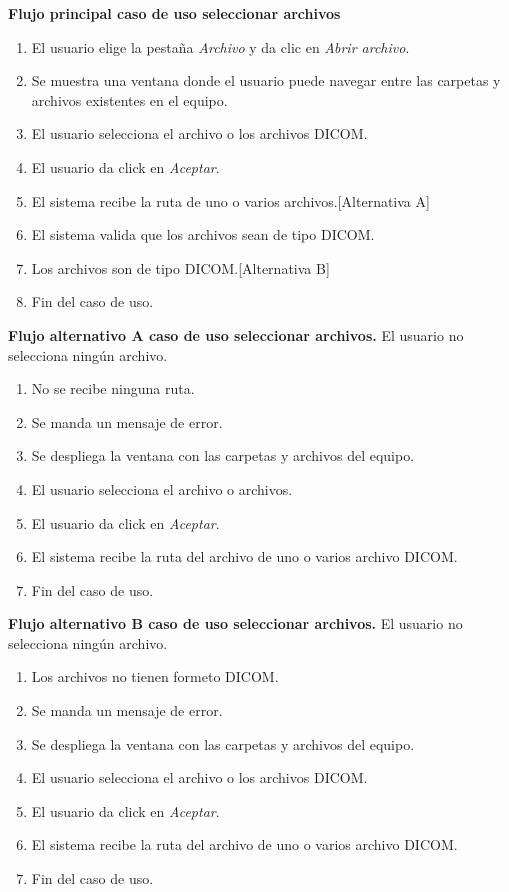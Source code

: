 \documentclass[12pt]{report}
\begin{document}
\textbf{Flujo principal caso de uso seleccionar archivos}
\begin{enumerate}
\item El usuario elige la pestaña \textit{Archivo} y da clic en \textit{Abrir archivo}.
\item Se muestra una ventana donde el usuario puede navegar entre las carpetas y archivos existentes en el equipo.
\item El usuario selecciona el archivo o los archivos DICOM.
\item El usuario da click en \textit{Aceptar}.
\item El sistema recibe la ruta de uno o varios archivos.[Alternativa A]
\item El sistema valida que los archivos sean de tipo DICOM.
\item Los archivos son de tipo DICOM.[Alternativa B]
\item Fin del caso de uso.
\end{enumerate}

\textbf{Flujo alternativo A caso de uso seleccionar archivos. }
El usuario no selecciona ningún archivo.
\begin{enumerate}[{A}1{.}]
\item No se recibe ninguna ruta.
\item Se manda un mensaje de error.
\item Se despliega la ventana con las carpetas y archivos del equipo.
\item El usuario selecciona el archivo o archivos.
\item El usuario da click en \textit{Aceptar}.
\item El sistema recibe la ruta del archivo de uno o varios archivo DICOM.
\item Fin del caso de uso.
\end{enumerate}

\textbf{Flujo alternativo B caso de uso seleccionar archivos. }
El usuario no selecciona ningún archivo.
\begin{enumerate}[{A}1{.}]
\item Los archivos no tienen formeto DICOM.
\item Se manda un mensaje de error.
\item Se despliega la ventana con las carpetas y archivos del equipo.
\item El usuario selecciona el archivo o los archivos DICOM.
\item El usuario da click en \textit{Aceptar}.
\item El sistema recibe la ruta del archivo de uno o varios archivo DICOM.
\item Fin del caso de uso.
\end{enumerate}
\end{document}
